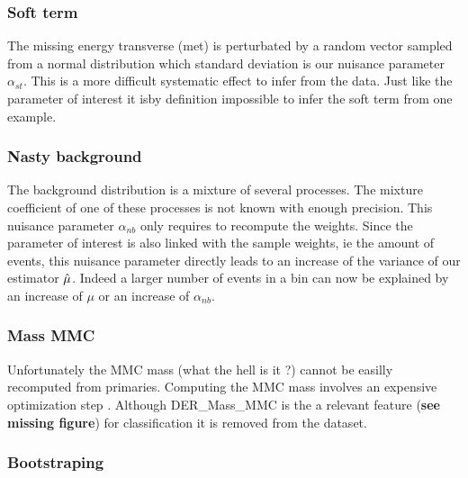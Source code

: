\subsubsection{Soft term} %
\label{ssub:soft_term}

The missing energy transverse (met) is perturbated by a random vector sampled from a normal distribution which standard deviation is our nuisance parameter $\alpha_{st}$.
This is a more difficult systematic effect to infer from the data.
Just like the parameter of interest it isby definition impossible to infer the soft term from one example.


\subsubsection{Nasty background} %
\label{ssub:nasty_background}

The background distribution is a mixture of several processes.
The mixture coefficient of one of these processes is not known with enough precision.
This nuisance parameter $\alpha_{nb}$ only requires to recompute the weights.
Since the parameter of interest is also linked with the sample weights, ie the amount of events, this nuisance parameter directly leads to an increase of the variance of our estimator $\hat\mu$.
Indeed a larger number of events in a bin can now be explained by an increase of $\mu$ or an increase of $\alpha_{nb}$.



\subsubsection{Mass MMC} %
\label{ssub:mass_mmc}

Unfortunately the MMC mass (what the hell is it ?) cannot be easilly recomputed from primaries.
Computing the MMC mass involves an expensive optimization step .
Although DER\_Mass\_MMC is the a relevant feature (\textbf{see missing figure}) for classification it is removed from the dataset.





\subsubsection{Bootstraping} %
\label{ssub:boostraping}


